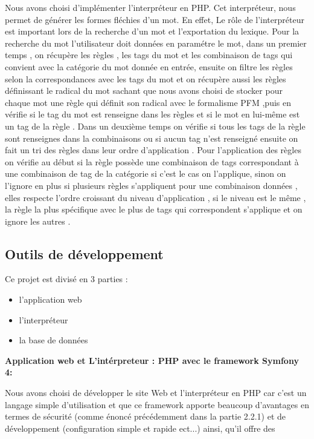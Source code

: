 \documentclass[12pt,a4paper]{article}
\begin{document}
Nous avons choisi d'implémenter l'interpréteur en PHP.
Cet interpréteur, nous permet de générer les formes fléchies d'un mot.
En effet, Le rôle de l'interpréteur est important lors de la recherche d'un mot et l'exportation du lexique.
Pour la recherche du mot l'utilisateur doit données en paramétre le mot, 
dans un premier temps , on récupère les règles , les tags du mot et les combinaison de tags qui convient avec la catégorie du mot donnée en entrée, ensuite on filtre les règles selon la correspondances avec les tags du mot et on récupère aussi les règles définissant le radical du mot sachant que nous avons choisi de stocker pour chaque mot une règle qui définit son radical avec le formalisme PFM ,puis en vérifie si le tag du mot est renseigne dans les règles et si le mot en lui-même est un tag de la règle . 
Dans un deuxième temps on vérifie si tous les tags de la règle sont renseignes dans la combinaisons ou si aucun tag n'est renseigné ensuite on fait un tri des règles dans leur ordre d'application .
Pour l'application des règles on vérifie au début si la règle possède une combinaison de tags correspondant à une combinaison de tag de la catégorie si c'est le cas on l'applique, sinon on l'ignore en plus si plusieurs règles s'appliquent pour une combinaison données , elles respecte l'ordre croissant du niveau d'application , si le niveau est le même , la règle la plus spécifique avec le plus de tags qui correspondent s'applique et on ignore les autres .

\subsection{Outils de développement}

Ce projet est divisé en 3 parties :
\begin{itemize}  
  \item l'application web
  \item l'interpréteur
  \item la base de données
\end{itemize}

\textbf{Application web et L'intérpreteur : PHP avec le framework Symfony 4:}

Nous avons choisi de développer le site Web et l'interpréteur en PHP car c'est un langage simple d'utilisation et que ce framework apporte beaucoup d'avantages en termes de sécurité (comme énoncé précédemment dans la partie 2.2.1) et de développement (configuration simple et rapide ect...) ainsi, qu'il offre des 
\end{document}
